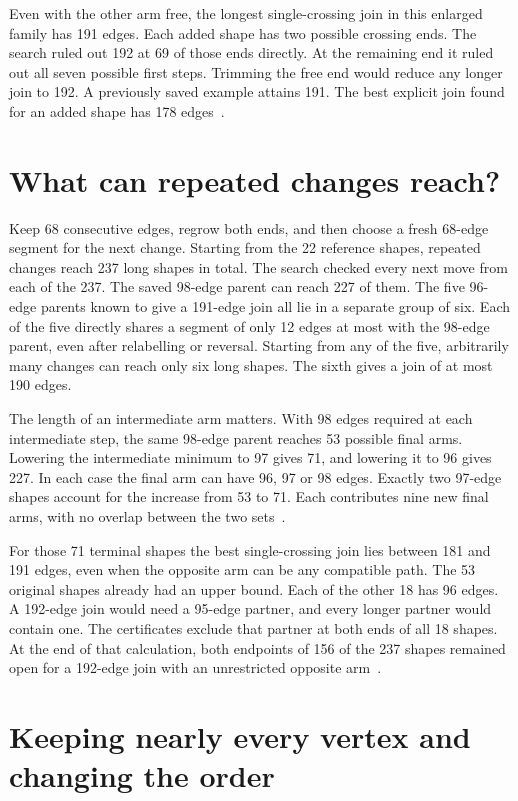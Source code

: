 \documentclass[11pt,a4paper]{article}
\begin{document}
Even with the other arm free, the longest single-crossing join
in this enlarged family has 191 edges. Each added shape has two
possible crossing ends. The search ruled out 192 at 69 of those
ends directly. At the remaining end it ruled out all seven possible
first steps. Trimming the free end would reduce any longer join
to 192. A previously saved example attains 191. The best explicit
join found for an added shape has 178 edges~\cite{short252}.

\section{What can repeated changes reach?}

Keep 68 consecutive edges, regrow both ends, and then choose a fresh
68-edge segment for the next change. Starting from the 22 reference
shapes, repeated changes reach 237 long shapes in total. The search
checked every next move from each of the 237. The saved 98-edge
parent can reach 227 of them. The five 96-edge parents known to
give a 191-edge join all lie in a separate group of six. Each of the
five directly shares a segment of only 12 edges at most with the
98-edge parent, even after relabelling or reversal. Starting from any of
the five, arbitrarily many changes can reach only six long shapes.
The sixth gives a join of at most 190 edges.

The length of an intermediate arm matters. With 98 edges required
at each intermediate step, the same 98-edge parent reaches 53 possible
final arms. Lowering the intermediate minimum to 97 gives 71, and
lowering it to 96 gives 227. In each case the final arm can have
96, 97 or 98 edges. Exactly two 97-edge shapes account for the
increase from 53 to 71. Each contributes nine new final arms,
with no overlap between the two sets~\cite{repeat253}.

For those 71 terminal shapes the best single-crossing join lies
between 181 and 191 edges, even when the opposite arm can be any
compatible path. The 53 original shapes already had an upper bound.
Each of the other 18 has 96 edges. A 192-edge join would need a
95-edge partner, and every longer partner would contain one. The
certificates exclude that partner at both ends of all 18 shapes.
At the end of that calculation, both endpoints of 156 of the 237
shapes remained open for a 192-edge join with an unrestricted
opposite arm~\cite{repeat253}.

\section{Keeping nearly every vertex and changing the order}
\end{document}
